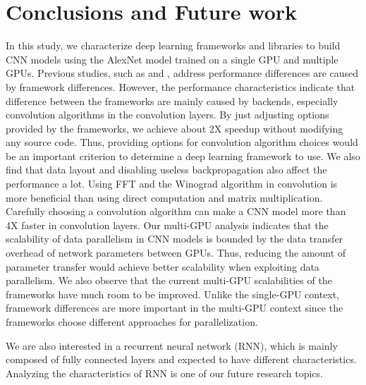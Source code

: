 \section{Conclusions and Future work}
In this study, we characterize deep learning frameworks and libraries to build CNN models using the AlexNet model trained on a single GPU and multiple GPUs.
Previous studies, such as \cite{DBLP:journals/corr/RussakovskyDSKSMHKKBBF14} and \cite{convnet-benchmarks}, address performance differences are caused by framework differences.
However, the performance characteristics indicate that difference between the frameworks are mainly caused by backends, especially convolution algorithms in the convolution layers.
By just adjusting options provided by the frameworks, we achieve about 2X speedup without modifying any source code.
Thus, providing options for convolution algorithm choices would be an important criterion to determine a deep learning framework to use.
We also find that data layout and disabling useless backpropagation also affect the performance a lot.
Using FFT and the Winograd algorithm in convolution is more beneficial than using direct computation and matrix multiplication.
Carefully choosing a convolution algorithm can make a CNN model more than 4X faster in convolution layers.
Our multi-GPU analysis indicates that the scalability of data parallelism in CNN models is bounded by the data transfer overhead of network parameters between GPUs.
Thus, reducing the amount of parameter transfer would achieve better scalability when exploiting data parallelism.
We also observe that the current multi-GPU scalabilities of the frameworks have much room to be improved.
Unlike the single-GPU context, framework differences are more important in the multi-GPU context since the frameworks choose different approaches for parallelization.

We are also interested in a recurrent neural network (RNN), which is mainly composed of fully connected layers and expected to have different characteristics.
Analyzing the characteristics of RNN is one of our future research topics.
